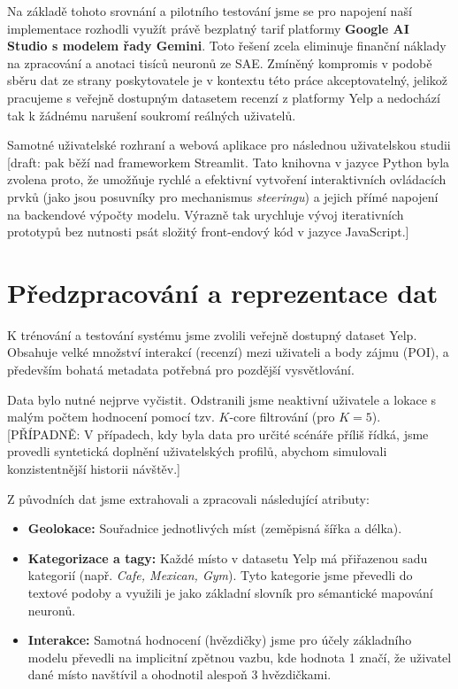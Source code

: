 Na základě tohoto srovnání a pilotního testování jsme se pro napojení naší implementace rozhodli využít právě bezplatný tarif platformy \textbf{Google AI Studio s modelem řady Gemini}. Toto řešení zcela eliminuje finanční náklady na zpracování a anotaci tisíců neuronů ze SAE. Zmíněný kompromis v podobě sběru dat ze strany poskytovatele je v kontextu této práce akceptovatelný, jelikož pracujeme s veřejně dostupným datasetem recenzí z platformy Yelp a nedochází tak k žádnému narušení soukromí reálných uživatelů.


Samotné uživatelské rozhraní a webová aplikace pro následnou uživatelskou studii [draft: pak běží nad frameworkem Streamlit. Tato knihovna v jazyce Python byla zvolena proto, že umožňuje rychlé a efektivní vytvoření interaktivních ovládacích prvků (jako jsou posuvníky pro mechanismus \textit{steeringu}) a jejich přímé napojení na backendové výpočty modelu. Výrazně tak urychluje vývoj iterativních prototypů bez nutnosti psát složitý front-endový kód v jazyce JavaScript.]

\section{Předzpracování a reprezentace dat}
\label{sec:data}

K trénování a testování systému jsme zvolili veřejně dostupný dataset Yelp. Obsahuje velké množství interakcí (recenzí) mezi uživateli a body zájmu (POI), a především bohatá metadata potřebná pro pozdější vysvětlování. 

Data bylo nutné nejprve vyčistit. Odstranili jsme neaktivní uživatele a lokace s malým počtem hodnocení pomocí tzv. $K$-core filtrování (pro $K = 5$). [PŘÍPADNĚ: V případech, kdy byla data pro určité scénáře příliš řídká, jsme provedli syntetická doplnění uživatelských profilů, abychom simulovali konzistentnější historii návštěv.]

Z původních dat jsme extrahovali a zpracovali následující atributy:
\begin{itemize}
    \item \textbf{Geolokace:} Souřadnice jednotlivých míst (zeměpisná šířka a délka).
    \item \textbf{Kategorizace a tagy:} Každé místo v datasetu Yelp má přiřazenou sadu kategorií (např. \textit{Cafe, Mexican, Gym}). Tyto kategorie jsme převedli do textové podoby a využili je jako základní slovník pro sémantické mapování neuronů.
    \item \textbf{Interakce:} Samotná hodnocení (hvězdičky) jsme pro účely základního modelu převedli na implicitní zpětnou vazbu, kde hodnota 1 značí, že uživatel dané místo navštívil a ohodnotil alespoň 3 hvězdičkami.
\end{itemize}

